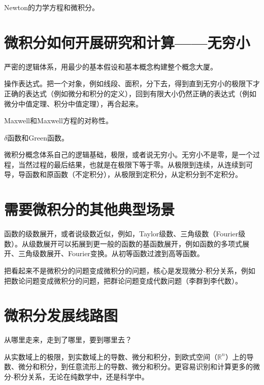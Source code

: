 \documentclass{ctexbook}
\begin{document}
Newton的力学方程和微积分。


\section{微积分如何开展研究和计算——无穷小}
严密的逻辑体系，用最少的基本假设和基本概念构建整个概念大厦。

操作表达式。把一个对象，例如线段、面积，分下去，得到直到无穷小的极限下才正确的表达式（例如微分和积分的定义），回到有限大小仍然正确的表达式（例如微分中值定理、积分中值定理），再合起来。

Maxwell和Maxwell方程的对称性。

$\delta$函数和Green函数。

微积分概念体系自己的逻辑基础，极限，或者说无穷小。无穷小不是零，是一个过程，当然过程的最后结果，也就是在极限下等于零。从极限到连续，从连续到可导，导函数和原函数（不定积分），从极限到定积分，从定积分到不定积分。

\section{需要微积分的其他典型场景}
函数的级数展开，或者说级数近似，例如，Taylor级数、三角级数（Fourier级数）。从级数展开可以拓展到更一般的函数的基函数展开，例如函数的多项式展开、三角级数展开、Fourier变换。从初等函数过渡到高等函数。

把看起来不是微积分的问题变成微积分的问题，核心是发现微分-积分关系，例如把数论问题变成微积分的问题，把群论问题变成代数问题（李群到李代数）。

\section{微积分发展线路图}
从哪里走来，走到了哪里，要到哪里去？

从实数域上的极限，到实数域上的导数、微分和积分，到欧式空间（$\mathbb{R}^{n}$）上的导数、微分和积分，到任意流形上的导数、微分和积分。更容易识别和计算更多的微分-积分关系，无论在纯数学中，还是科学中。
\end{document}
